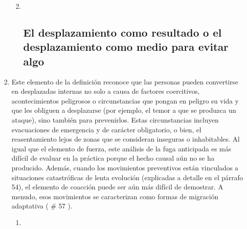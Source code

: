 \documentclass[
]{book}
\begin{document}
\begin{enumerate}
  \begin{enumerate}
  \def\labelenumii{\arabic{enumii}.}
  \item ~
    \hypertarget{el-desplazamiento-como-resultado-o-el-desplazamiento-como-medio-para-evitar-algo}{%
    \subsection{El desplazamiento como resultado o el desplazamiento como medio para evitar algo}\label{el-desplazamiento-como-resultado-o-el-desplazamiento-como-medio-para-evitar-algo}}
  \end{enumerate}
\item
  Este elemento de la definición reconoce que las personas pueden convertirse en desplazadas internas no solo a causa de factores coercitivos, acontecimientos peligrosos o circunstancias que pongan en peligro su vida y que les obliguen a desplazarse (por ejemplo, el temor a que se produzca un ataque), sino también para prevenirlos. Estas circunstancias incluyen evacuaciones de emergencia y de carácter obligatorio, o bien, el reasentamiento lejos de zonas que se consideran inseguras o inhabitables. Al igual que el elemento de fuerza, este análisis de la fuga anticipada es más difícil de evaluar en la práctica porque el hecho causal aún no se ha producido. Además, cuando los movimientos preventivos están vinculados a situaciones catastróficas de lenta evolución (explicadas a detalle en el párrafo 54), el elemento de coacción puede ser aún más difícil de demostrar. A menudo, esos movimientos se caracterizan como formas de migración adaptativa (
  \# 57
  ).

  \begin{enumerate}
  \def\labelenumii{\arabic{enumii}.}
  \item ~
    \hypertarget{causas}{%
}
\end{enumerate}
\end{enumerate}
\end{document}
